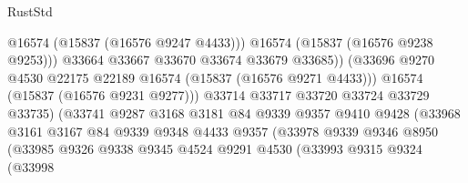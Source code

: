 \begin{lexlean}{RustStd}
\begin{coremodule}
{\begin{coremodule}
{{{{{{{{{{{{{{{{{{{{{{{{{{{{{{{{{{{{{{{{{{{{{{{{{{{{{{{{{{{{                                            @16574
                                            (@15837 (@16576 @9247 @4433)))
                                          @16574
                                          (@15837 (@16576 @9238 @9253)))
                                        @33664
                                        @33667
                                        @33670
                                        @33674
                                        @33679
                                        @33685))
                                    (@33696
                                      @9270
                                      @4530
                                      @22175
                                      @22189
                                      @16574
                                      (@15837 (@16576 @9271 @4433)))
                                    @16574
                                    (@15837 (@16576 @9231 @9277)))
                                  @33714
                                  @33717
                                  @33720
                                  @33724
                                  @33729
                                  @33735)
                                (@33741
                                  @9287
                                  @3168
                                  @3181
                                  @84
                                  @9339
                                  @9357
                                  @9410
                                  @9428
                                  (@33968
                                    @3161
                                    @3167
                                    @84
                                    @9339
                                    @9348
                                    @4433
                                    @9357
                                    (@33978
                                      @9339
                                      @9346
                                      @8950
                                      (@33985
                                        @9326
                                        @9338
                                        @9345
                                        @4524
                                        @9291
                                        @4530
                                        (@33993
                                          @9315
                                          @9324
                                          (@33998
}}}}}}}}}}}}}}}}}}}}}}}}}}}}}}}}}}}}}}}}}}}}}}}}}}}}}}}}}}}}
\end{coremodule}}
\end{coremodule}
\end{lexlean}

